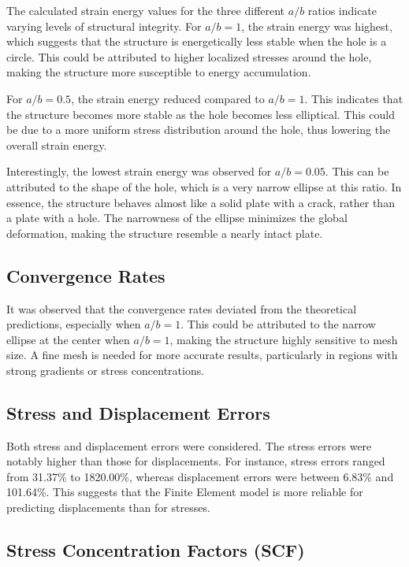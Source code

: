 \documentclass[twoside,twocolumn,10pt]{article}
\begin{document}
The calculated strain energy values for the three different \( a/b \) ratios indicate varying levels of structural integrity. For \( a/b = 1 \), the strain energy was highest, which suggests that the structure is energetically less stable when the hole is a circle. This could be attributed to higher localized stresses around the hole, making the structure more susceptible to energy accumulation.

For \( a/b = 0.5 \), the strain energy reduced compared to \( a/b = 1 \). This indicates that the structure becomes more stable as the hole becomes less elliptical. This could be due to a more uniform stress distribution around the hole, thus lowering the overall strain energy.

Interestingly, the lowest strain energy was observed for \( a/b = 0.05 \). This can be attributed to the shape of the hole, which is a very narrow ellipse at this ratio. In essence, the structure behaves almost like a solid plate with a crack, rather than a plate with a hole. The narrowness of the ellipse minimizes the global deformation, making the structure resemble a nearly intact plate.

\subsection*{Convergence Rates}

It was observed that the convergence rates deviated from the theoretical predictions, especially when \( a/b = 1 \). This could be attributed to the narrow ellipse at the center when \( a/b = 1 \), making the structure highly sensitive to mesh size. A fine mesh is needed for more accurate results, particularly in regions with strong gradients or stress concentrations.

\subsection*{Stress and Displacement Errors}

Both stress and displacement errors were considered. The stress errors were notably higher than those for displacements. For instance, stress errors ranged from 31.37\% to 1820.00\%, whereas displacement errors were between 6.83\% and 101.64\%. This suggests that the Finite Element model is more reliable for predicting displacements than for stresses.

\subsection*{Stress Concentration Factors (SCF)}
\end{document}
